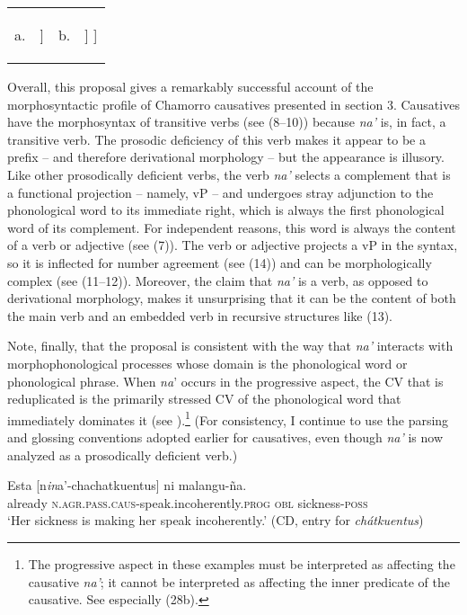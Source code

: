 \documentclass[output=paper,
modfonts
]{LSP/langsci}
\begin{document}
\begin{exe}
\begin{xlist}
\ea
\begin{tabularx}{\linewidth-0.1em}[t]{lXlX}
	a. &
	\begin{forest}
			[ω
				[na']
				[ω]
			]
	\end{forest} &
b. &
\begin{forest}
				[ω
					[na']
					[ω
						[fan-\dots\dots]
					]
				]
	\end{forest} \\	
\end{tabularx}\label{ex:strayadjna'}
\z

Overall, this proposal gives a remarkably successful account of the
morphosyntactic profile of Chamorro causatives presented in section 3.
Causatives have the morphosyntax of transitive verbs (see (8--10))
because \emph{na'} is, in fact, a transitive verb. The prosodic
deficiency of this verb makes it appear to be a prefix -- and therefore
derivational morphology -- but the appearance is illusory. Like other
prosodically deficient verbs, the verb \emph{na'} selects a complement
that is a functional projection -- namely, vP -- and undergoes stray
adjunction to the phonological word to its immediate right, which is
always the first phonological word of its complement. For independent
reasons, this word is always the content of a verb or adjective (see
(7)). The verb or adjective projects a vP in the syntax, so it is
inflected for number agreement (see (14)) and can be morphologically
complex (see (11--12)). Moreover, the claim that \emph{na'} is a verb, as
opposed to derivational morphology, makes it unsurprising that it can be
the content of both the main verb and an embedded verb in recursive
structures like (13).

Note, finally, that the proposal is consistent with the way that
\emph{na'} interacts with morphophonological processes whose domain is
the phonological word or phonological phrase. When \emph{na}' occurs in
the progressive aspect, the CV that is reduplicated is the primarily
stressed CV of the phonological word that immediately dominates it (see
\citealt[79--81]{gibson1980}).\footnote{The progressive aspect in these examples
  must be interpreted as affecting the causative \emph{na'}; it cannot
  be interpreted as affecting the inner predicate of the causative. See
  especially (28b).} (For consistency, I continue to use the parsing and
glossing conventions adopted earlier for causatives, even though
\emph{na'} is now analyzed as a prosodically deficient verb.)

\ea
\ea
\gll Esta {[}n\emph{in}a'-chachatkuentus{]} ni malangu-ña.\\
already \textsc{n.agr.pass.caus-}speak.incoherently.\textsc{prog} \textsc{obl} sickness-\textsc{poss}\\
\glt `Her sickness is making her speak incoherently.' (CD, entry for \emph{chátkuentus})


\end{xlist}
\end{exe}
\end{document}
